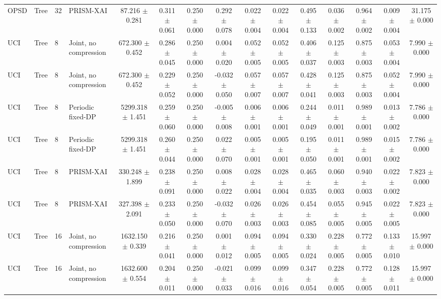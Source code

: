 \begin{tabular}{llllccccccccccc}
OPSD & Tree & 32 & PRISM-XAI & 87.216 $\pm$ 0.281 & 0.311 $\pm$ 0.061 & 0.250 $\pm$ 0.000 & 0.292 $\pm$ 0.078 & 0.022 $\pm$ 0.004 & 0.022 $\pm$ 0.004 & 0.495 $\pm$ 0.133 & 0.036 $\pm$ 0.002 & 0.964 $\pm$ 0.002 & 0.009 $\pm$ 0.004 & 31.175 $\pm$ 0.000 \\
UCI & Tree & 8 & Joint, no compression & 672.300 $\pm$ 0.452 & 0.286 $\pm$ 0.045 & 0.250 $\pm$ 0.000 & 0.004 $\pm$ 0.020 & 0.052 $\pm$ 0.005 & 0.052 $\pm$ 0.005 & 0.406 $\pm$ 0.037 & 0.125 $\pm$ 0.003 & 0.875 $\pm$ 0.003 & 0.053 $\pm$ 0.004 & 7.990 $\pm$ 0.000 \\
UCI & Tree & 8 & Joint, no compression & 672.300 $\pm$ 0.452 & 0.229 $\pm$ 0.052 & 0.250 $\pm$ 0.000 & -0.032 $\pm$ 0.050 & 0.057 $\pm$ 0.007 & 0.057 $\pm$ 0.007 & 0.428 $\pm$ 0.041 & 0.125 $\pm$ 0.003 & 0.875 $\pm$ 0.003 & 0.052 $\pm$ 0.004 & 7.990 $\pm$ 0.000 \\
UCI & Tree & 8 & Periodic fixed-DP & 5299.318 $\pm$ 1.451 & 0.259 $\pm$ 0.060 & 0.250 $\pm$ 0.000 & -0.005 $\pm$ 0.008 & 0.006 $\pm$ 0.001 & 0.006 $\pm$ 0.001 & 0.244 $\pm$ 0.049 & 0.011 $\pm$ 0.001 & 0.989 $\pm$ 0.001 & 0.013 $\pm$ 0.002 & 7.786 $\pm$ 0.000 \\
UCI & Tree & 8 & Periodic fixed-DP & 5299.318 $\pm$ 1.451 & 0.260 $\pm$ 0.044 & 0.250 $\pm$ 0.000 & 0.022 $\pm$ 0.070 & 0.005 $\pm$ 0.001 & 0.005 $\pm$ 0.001 & 0.195 $\pm$ 0.050 & 0.011 $\pm$ 0.001 & 0.989 $\pm$ 0.001 & 0.015 $\pm$ 0.002 & 7.786 $\pm$ 0.000 \\
UCI & Tree & 8 & PRISM-XAI & 330.248 $\pm$ 1.899 & 0.238 $\pm$ 0.091 & 0.250 $\pm$ 0.000 & 0.008 $\pm$ 0.022 & 0.028 $\pm$ 0.004 & 0.028 $\pm$ 0.004 & 0.465 $\pm$ 0.035 & 0.060 $\pm$ 0.003 & 0.940 $\pm$ 0.003 & 0.022 $\pm$ 0.002 & 7.823 $\pm$ 0.000 \\
UCI & Tree & 8 & PRISM-XAI & 327.398 $\pm$ 2.091 & 0.233 $\pm$ 0.050 & 0.250 $\pm$ 0.000 & -0.032 $\pm$ 0.070 & 0.026 $\pm$ 0.003 & 0.026 $\pm$ 0.003 & 0.454 $\pm$ 0.085 & 0.055 $\pm$ 0.005 & 0.945 $\pm$ 0.005 & 0.022 $\pm$ 0.005 & 7.823 $\pm$ 0.000 \\
UCI & Tree & 16 & Joint, no compression & 1632.150 $\pm$ 0.339 & 0.216 $\pm$ 0.041 & 0.250 $\pm$ 0.000 & 0.001 $\pm$ 0.012 & 0.094 $\pm$ 0.005 & 0.094 $\pm$ 0.005 & 0.330 $\pm$ 0.024 & 0.228 $\pm$ 0.005 & 0.772 $\pm$ 0.005 & 0.133 $\pm$ 0.010 & 15.997 $\pm$ 0.000 \\
UCI & Tree & 16 & Joint, no compression & 1632.600 $\pm$ 0.554 & 0.204 $\pm$ 0.011 & 0.250 $\pm$ 0.000 & -0.021 $\pm$ 0.033 & 0.099 $\pm$ 0.016 & 0.099 $\pm$ 0.016 & 0.347 $\pm$ 0.054 & 0.228 $\pm$ 0.005 & 0.772 $\pm$ 0.005 & 0.128 $\pm$ 0.011 & 15.997 $\pm$ 0.000 \\

\end{tabular}
